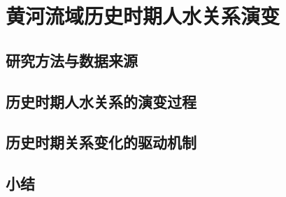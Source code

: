 \chapter{黄河流域历史时期人水关系演变}\label{cha:3}


\section{研究方法与数据来源}\label{ch3:methods}



\section{历史时期人水关系的演变过程}\label{ch3:process}


\section{历史时期关系变化的驱动机制}\label{ch3:mechanism}





\section{小结}\label{ch3:summary}

